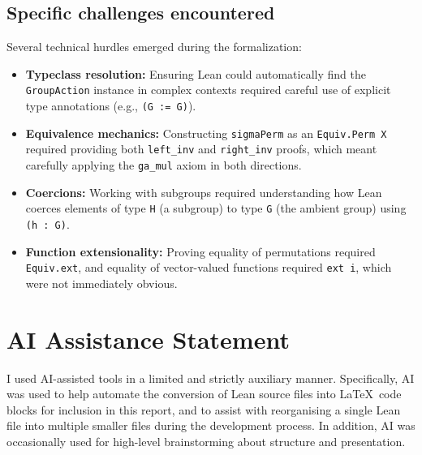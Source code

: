 \documentclass[
  12pt, %
]{assignment}
\begin{document}
\subsection{Specific challenges encountered}
Several technical hurdles emerged during the formalization:
\begin{itemize}
	\item \textbf{Typeclass resolution:} Ensuring Lean could automatically find the \texttt{GroupAction}
	      instance in complex contexts required careful use of explicit type annotations (e.g., \texttt{(G := G)}).
	\item \textbf{Equivalence mechanics:} Constructing \texttt{sigmaPerm} as an \texttt{Equiv.Perm X}
	      required providing both \texttt{left\_inv} and \texttt{right\_inv} proofs, which meant carefully
	      applying the \texttt{ga\_mul} axiom in both directions.
	\item \textbf{Coercions:} Working with subgroups required understanding how Lean coerces elements
	      of type \texttt{H} (a subgroup) to type \texttt{G} (the ambient group) using \texttt{(h : G)}.
	\item \textbf{Function extensionality:} Proving equality of permutations required \texttt{Equiv.ext},
	      and equality of vector-valued functions required \texttt{ext i}, which were not immediately obvious.
\end{itemize}

\section{AI Assistance Statement}
I used AI-assisted tools in a limited and strictly auxiliary manner. Specifically, AI was used to help automate the conversion of Lean source files into \LaTeX\ code blocks for inclusion in this report, and to assist with reorganising a single Lean file into multiple smaller files during the development process. In addition, AI was occasionally used for high-level brainstorming about structure and presentation.
\end{document}
